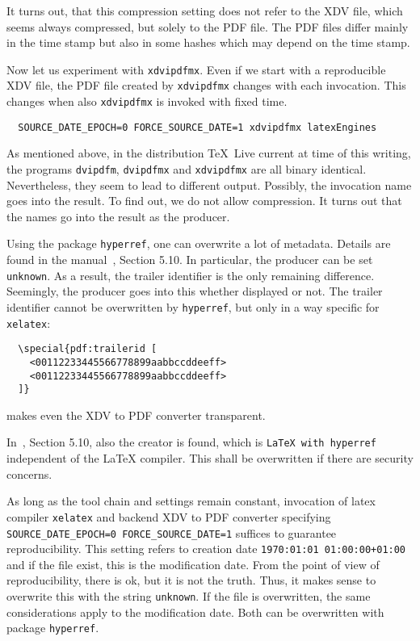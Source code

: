 \documentclass[a4paper]{article}%
\newcommand{\xelatex}{\texttt{xelatex}}
\newcommand{\texlive}{\TeX~Live}
\begin{document}
It turns out, that this compression setting does not refer to the XDV file, 
which seems always compressed, but solely to the PDF file. 
The PDF files differ mainly in the time stamp 
but also in some hashes which may depend on the time stamp. 

Now let us experiment with \texttt{xdvipdfmx}. 
Even if we start with a reproducible XDV file, 
the PDF file created by \texttt{xdvipdfmx} 
changes with each invocation. 
This changes when also \texttt{xdvipdfmx} is invoked with fixed time. 
%
\begin{verbatim}
  SOURCE_DATE_EPOCH=0 FORCE_SOURCE_DATE=1 xdvipdfmx latexEngines
\end{verbatim}

As mentioned above, in the distribution \texlive{} current at time of this writing, 
the programs \texttt{dvipdfm}, \texttt{dvipdfmx} and \texttt{xdvipdfmx} 
are all binary identical. 
Nevertheless, they seem to lead to different output. 
Possibly, the invocation name goes into the result. 
To find out, we do not allow compression. 
It turns out that the names go into the result as the producer. 

Using the package \texttt{hyperref}, 
one can overwrite a lot of metadata. 
Details are found in the manual~\cite{HyperTextP}, Section 5.10. 
In particular, the producer can be set \texttt{unknown}. 
As a result, the trailer identifier is the only remaining difference. 
Seemingly, the producer goes into this whether displayed or not. 
The trailer identifier cannot be overwritten by \texttt{hyperref}, 
but only in a way specific for \xelatex: 
%
\begin{verbatim}
  \special{pdf:trailerid [
    <00112233445566778899aabbccddeeff>
    <00112233445566778899aabbccddeeff>
  ]}  
\end{verbatim}
%
makes even the XDV to PDF converter transparent. 

In~\cite{HyperTextP}, Section 5.10, also the creator is found, 
which is \texttt{LaTeX with hyperref} independent of the \LaTeX{} compiler. 
This shall be overwritten if there are security concerns. 

As long as the tool chain and settings remain constant, 
invocation of latex compiler \xelatex{} and backend XDV to PDF converter 
specifying \texttt{SOURCE\_DATE\_EPOCH=0 FORCE\_SOURCE\_DATE=1} 
suffices to guarantee reproducibility. 
This setting refers to creation date \texttt{1970:01:01 01:00:00+01:00} 
and if the file exist, this is the modification date. 
From the point of view of reproducibility, 
there is ok, but it is not the truth. 
Thus, it makes sense to overwrite this with the string \texttt{unknown}. 
If the file is overwritten, the same considerations apply to the modification date. 
Both can be overwritten with package \texttt{hyperref}. 
\end{document}
